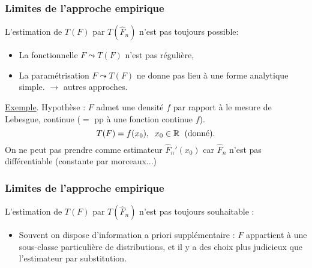 \begin{frame}
\frametitle{Limites de l'approche empirique} L'estimation de $T(F)$
par $T(\widehat F_n)$ n'est pas toujours \alert{possible}:
%
%
\begin{itemize}
\item La fonctionnelle $F \leadsto T(F)$ n'est pas \og régulière\fg{},
\item La paramétrisation $F \leadsto T(F)$ ne donne \alert{pas} lieu à une \alert{forme analytique simple}.
$\rightarrow$ autres approches.
\end{itemize}
%
\underline{Exemple}. \alert{Hypothèse} : $F$ admet une densité
$f$ par rapport à le mesure de Lebesgue, \alert{continue} ($=$
pp à une fonction continue $f$).
$$T(F) = f(x_0),\;\;x_0\in \operatorname{{\mathbb R}} \,\;\text{(donné)}.$$
On ne \alert{peut pas prendre} comme estimateur $\widehat
F_n'(x_0)$ car $\widehat F_n$ n'est pas diff\'erentiable (constante
par morceaux...)

\end{frame}

\begin{frame}
\frametitle{Limites de l'approche empirique} L'estimation de $T(F)$
par $T(\widehat F_n)$ n'est pas toujours \alert{souhaitable} :
\begin{itemize}
\item
Souvent on dispose d'information \alert{a priori}
supplémentaire : $F$ appartient à une sous-classe \alert{
particulière} de distributions, et il y a des choix plus judicieux
que l'estimateur par substitution.
\end{itemize}
\end{frame}


